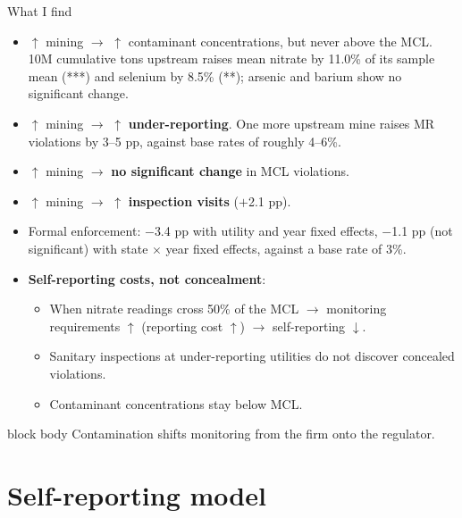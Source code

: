 \documentclass{beamer}
\begin{document}
\begin{frame}{What I find}
\begin{itemize}\small
    \item $\uparrow$ mining $\rightarrow$ $\uparrow$ contaminant concentrations, but never above the MCL. 10M cumulative tons upstream raises mean nitrate by 11.0\% of its sample mean (***) and selenium by 8.5\% (**); arsenic and barium show no significant change.
    \item $\uparrow$ mining $\rightarrow$ $\uparrow$ \textbf{under-reporting}. One more upstream mine raises MR violations by 3--5 pp, against base rates of roughly 4--6\%.
    \item $\uparrow$ mining $\rightarrow$ \textbf{no significant change} in MCL violations.
    \item $\uparrow$ mining $\rightarrow$ $\uparrow$ \textbf{inspection visits} ($+$2.1 pp).
    \item Formal enforcement: $-$3.4 pp with utility and year fixed effects, $-$1.1 pp (not significant) with state $\times$ year fixed effects, against a base rate of 3\%.
    \item \textbf{Self-reporting costs, not concealment}: 
    \begin{itemize}
        \item When nitrate readings cross 50\% of the MCL $\rightarrow$ monitoring requirements $\uparrow$ (reporting cost $\uparrow$) $\rightarrow$ self-reporting $\downarrow$.
        \item Sanitary inspections at under-reporting utilities do not discover concealed violations.
        \item Contaminant concentrations stay below MCL.
    \end{itemize}
\end{itemize}
\medskip
\begin{center}
\begin{beamercolorbox}[sep=6pt,center,rounded=true]{block body}
Contamination shifts monitoring from the firm onto the regulator.
\end{beamercolorbox}
\end{center}
\end{frame}

\section{Self-reporting model}
\end{document}
